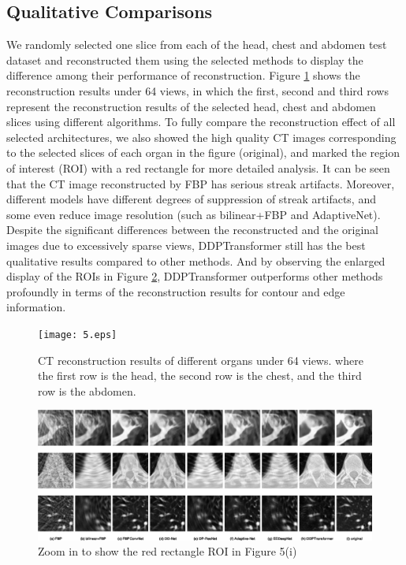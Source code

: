\documentclass[lettersize,journal]{IEEEtran}
\begin{document}
\subsection{Qualitative Comparisons}

We randomly selected one slice from each of the head, chest and abdomen test dataset and reconstructed them using the selected methods to display the difference among their performance of reconstruction. Figure \ref{fig5} shows the reconstruction results under 64 views, in which the first, second and third rows represent the reconstruction results of the selected head, chest and abdomen slices using different algorithms. To fully compare the reconstruction effect of all selected architectures, we also showed the high quality CT images corresponding to the selected slices of each organ in the figure (original), and marked the region of interest (ROI) with a red rectangle for more detailed analysis. It can be seen that the CT image reconstructed by FBP has serious streak artifacts. Moreover, different models have different degrees of suppression of streak artifacts, and some even reduce image resolution (such as bilinear+FBP and AdaptiveNet). Despite the significant differences between the reconstructed and the original images due to excessively sparse views, DDPTransformer still has the best qualitative results compared to other methods. And by observing the enlarged display of the ROIs in Figure \ref{fig6}, DDPTransformer outperforms other methods profoundly in terms of the reconstruction results for contour and edge information.

\begin{figure}[!t]
	\centering
	\texttt{[image: 5.eps]}
	\caption{CT reconstruction results of different organs under 64 views. where the first row is the head, the second row is the chest, and the third row is the abdomen.}
	\label{fig5}
\end{figure}
\begin{figure}[!t]
	\centering
	\includegraphics[width=6.5in]{6.eps}
	\caption{Zoom in to show the red rectangle ROI in Figure 5(i)}
	\label{fig6}
\end{figure}
\end{document}
